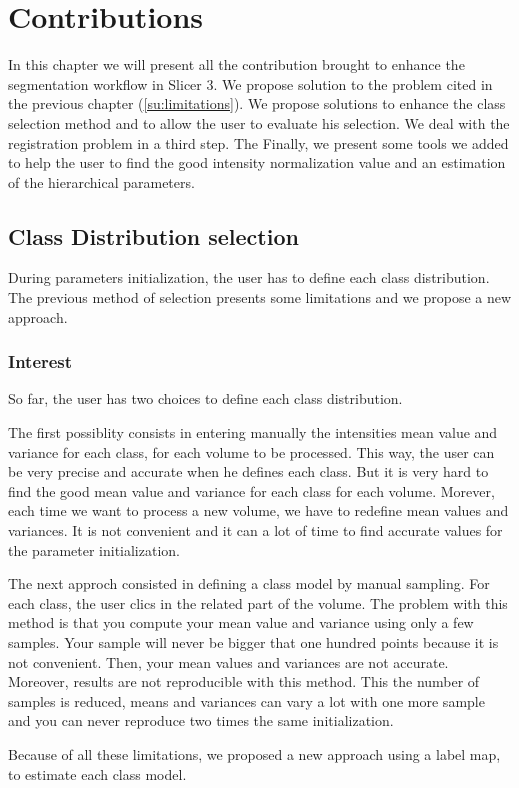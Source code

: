 \chapter{Contributions}\label{sec:contributions}
In this chapter we will present all the contribution brought to enhance the segmentation workflow in Slicer 3. We propose solution to the problem cited in the previous chapter (\ref{su:limitations}). We propose solutions to enhance the class selection method and to allow the user to evaluate his selection. We deal with the registration problem in a third step. The Finally, we present some tools we added to help the user to find the good intensity normalization value and an estimation of the hierarchical parameters.
%
\section{Class Distribution selection}\label{sec:CDS}
%
During parameters initialization, the user has to define each class distribution. The previous method of selection presents some limitations and we propose a new approach.
%
\subsection{Interest}
%
So far, the user has two choices to define each class distribution. 
\par
The first possiblity consists in entering manually the intensities mean value and variance for each class, for each volume to be processed. This way, the user can be very precise and accurate when he defines each class. But it is very hard to find the good mean value and variance for each class for each volume. Morever, each time we want to process a new volume, we have to redefine mean values and variances. It is not convenient and it can a lot of time to find accurate values for the parameter initialization. 
\par
The next approch consisted in defining a class model by manual sampling. For each class, the user clics in the related part of the volume. The problem with this method is that you compute your mean value and variance using only a few samples. Your sample will never be bigger that one hundred points because it is not convenient. Then, your mean values and variances are not accurate. Moreover, results are not reproducible with this method. This the number of samples is reduced, means and variances can vary a lot with one more sample and you can never reproduce two times the same initialization.
\par
Because of all these limitations,  we proposed a new approach using a label map, to estimate each class model.
%
